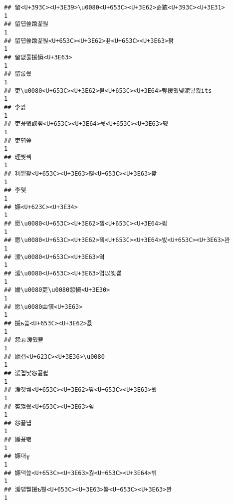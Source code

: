\documentclass[]{article}
\begin{document}
\begin{verbatim}
## 留<U+393C><U+3E39>\u0080<U+653C><U+3E62>슌猿<U+393C><U+3E31>                                                1
## 留덉쓣踰꾩뒪                                                            1
## 留덉쓣踰꾩뒪<U+653C><U+3E62>끂<U+653C><U+3E63>꽑                                                1
## 留덊룷援愼<U+3E63>                                                            1
## 留롮씠                                                                  1
## 吏\u0080<U+653C><U+3E62>뒫<U+653C><U+3E64>삎援먰넻泥닿퀎its                                     1
## 李꽑                                                                    1
## 吏꾪뻾諛뼢<U+653C><U+3E64>몴<U+653C><U+3E63>떇                                                  1
## 吏덉쓽                                                                  1
## 理쒖쥌                                                                  1
## 利앹꽕<U+653C><U+3E63>떊<U+653C><U+3E63>꽕                                                      1
## 李웾                                                                    1
## 嫄<U+623C><U+3E34>                                                                  1
## 愿\u0080<U+653C><U+3E62>젴<U+653C><U+3E64>븳                                                    1
## 愿\u0080<U+653C><U+3E62>젴<U+653C><U+3E64>빐<U+653C><U+3E63>꽌                                              1
## 湲\u0080<U+653C><U+3E63>옄                                                          1
## 湲\u0080<U+653C><U+3E63>옄以묒뿉                                                    1
## 媛\u0080吏\u0080怨愼<U+3E30>                                                  1
## 愿\u0080由愼<U+3E63>                                                          1
## 援ъ쓽<U+653C><U+3E62>룞                                                            1
## 怨ぉ湲몄뿉                                                              1
## 嫄곕<U+623C><U+3E36>\u0080                                                          1
## 湲곕낯怨꾪쉷                                                            1
## 湲곗궗<U+653C><U+3E62>떂<U+653C><U+3E63>씠                                                      1
## 寃껋씠<U+653C><U+3E63>슂                                                            1
## 怨꾩냽                                                                  1
## 媛꾪뙋                                                                  1
## 嫄대┰                                                                  1
## 嫄댁쓽<U+653C><U+3E63>궗<U+653C><U+3E64>빆                                                      1
## 湲덉뿰援ъ뿭<U+653C><U+3E63>뿉<U+653C><U+3E63>꽌                                                1

\end{verbatim}
\end{document}
